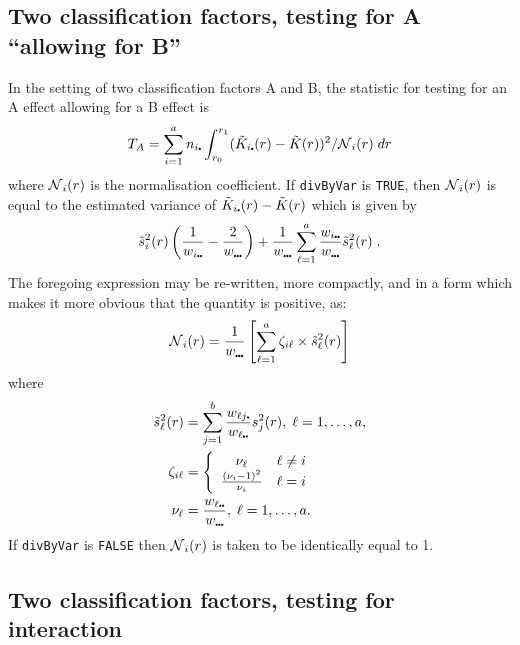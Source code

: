\documentclass[12pt]{article}
\newcommand{\pt}{\mbox{\scalebox{0.4}{$\bullet$}}}
\newcommand{\tils}{\mbox{$\tilde{s}$}}
\newcommand{\sco}{\mbox{$\cal N$}}
\begin{document}
\subsection{Two classification factors, testing for A ``allowing for B''}
\label{sec:teststats.testForA}
In the setting of two classification factors A and B, the statistic
for testing for an A effect allowing for a B effect is
\[
T_A = \sum_{i=1}^a n_{i \pt} \int_{r_0}^{r_1} (\tilde{K}_{i \pt}(r) -
                 \tilde{K}(r))^2/\sco_i(r) \; dr
\]
where $\sco_i(r)$ is the normalisation coefficient.  If
\texttt{divByVar} is \texttt{TRUE}, then $\sco_i(r)$ is equal
to the estimated variance of $\tilde{K}_{i \pt}(r) - \tilde{K}(r)$
which is given by
\[
\tils_i^2(r) \left ( \frac{1}{w_{i \pt \pt}} - \frac{2}{w_{\pt \pt \pt}}
                      \right ) + \frac{1}{w_{\pt \pt \pt}} \sum_{\ell=1}^a
                      \frac{w_{i \pt \pt}}{w_{\pt \pt \pt}} \tils_{\ell}^2(r) \; .
\]
The foregoing expression may be re-written, more compactly, and in a form which
makes it more obvious that the quantity is positive, as:
\[
\sco_i(r) = \frac{1}{w_{\pt \pt \pt}} \left [
            \sum_{\ell=1}^a \zeta_{i \ell} \times \tils^2_{\ell}(r) \right ]
\]
where
\begin{align*}
\tils^2_{\ell}(r) &= \sum_{j=1}^b \frac{w_{\ell j\pt}}{w_{\ell \pt \pt}} s_j^2(r),
\; \ell = 1, \ldots, a, \\
\zeta_{i \ell} &= \left \{ \begin{array}{cl}
               \nu_{\ell} & \ell \neq i \\
               \frac{(\nu_i - 1)^2}{\nu_i} & \ell = i 
               \end{array} \right . \\
\nu_{\ell} &= \frac{w_{\ell \pt \pt}}{w_{\pt \pt \pt}}, \;
\ell = 1, \ldots, a.
\end{align*}
If \texttt{divByVar} is \texttt{FALSE} then $\sco_i(r)$ is taken to
be identically equal to 1.

\subsection{Two classification factors, testing for interaction}
\label{sec:teststats.testForInterac}
\end{document}
